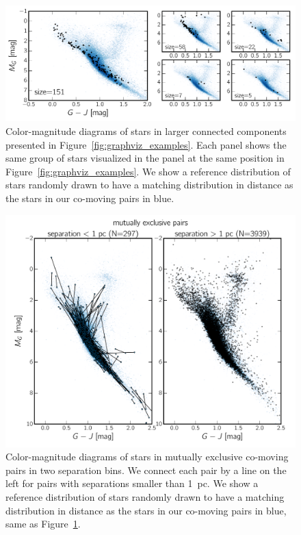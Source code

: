 \documentclass[manuscript, letterpaper]{aastex6}
\begin{document}
\begin{figure}[htbp]
  \begin{center}
    \includegraphics[width=\textwidth]{gjg_graphviz_examples.pdf}
  \end{center}
  \caption{
    Color-magnitude diagrams of stars in larger connected components presented in
    Figure~\ref{fig:graphviz_examples}. Each panel shows the same group
    of stars visualized in the panel at the same position
    in Figure~\ref{fig:graphviz_examples}.
    We show a reference distribution of stars randomly drawn to have
    a matching distribution in distance as the stars in our co-moving pairs
    in blue.
    \label{fig:cmd_large}}
\end{figure}

\begin{figure}[htbp]
  \begin{center}
    \includegraphics[width=\textwidth]{gjg_mepairs.pdf}
  \end{center}
  \caption{
    Color-magnitude diagrams of stars in mutually exclusive co-moving pairs
    in two separation bins.
    We connect each pair by a line on the left for pairs
    with separations smaller than 1~pc.
    We show a reference distribution of stars randomly drawn to have
    a matching distribution in distance as the stars in our co-moving pairs
    in blue, same as Figure~\ref{fig:cmd_large}.
    \label{fig:cmd_me}}
\end{figure}
\end{document}
